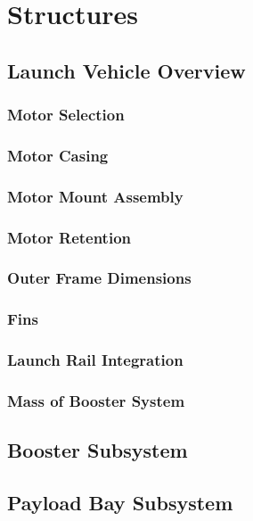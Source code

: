 \chapter{Structures}

\section{Launch Vehicle Overview}
    \subsection{Motor Selection}

    \subsection{Motor Casing}


    \subsection{Motor Mount Assembly}


    \subsection{Motor Retention}


    \subsection{Outer Frame Dimensions}


    \subsection{Fins}


    \subsection{Launch Rail Integration}
    
    \subsection{Mass of Booster System}

\section{Booster Subsystem}
\section{Payload Bay Subsystem}

